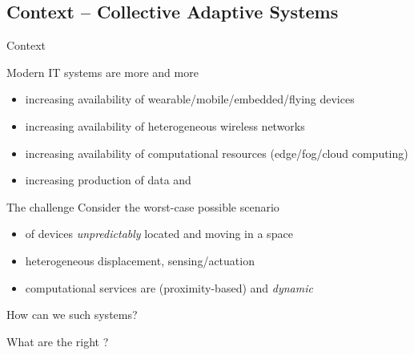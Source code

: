 \documentclass[presentation, 9pt]{beamer}\mode<presentation>{\usetheme{AMSBolognaFC}}
\begin{document}
\subsection{Context -- Collective Adaptive Systems}
\begin{frame}{Context}\label{context:start}
\begin{exampleblock}{Modern IT systems are more and more }
	\begin{itemize}
		\item increasing availability of wearable/mobile/embedded/flying devices
		\item increasing availability of heterogeneous wireless networks
		\item increasing availability of computational resources (edge/fog/cloud computing)
		\item increasing production of data  and 
	\end{itemize}
\end{exampleblock}
\begin{alertblock}{The challenge}
	Consider the worst-case possible scenario
	\begin{itemize}
		\item {} of devices \emph{unpredictably} located and moving in a space
		\item heterogeneous displacement,  sensing/actuation
		\item computational services are  (proximity-based) and \emph{dynamic} 
	\end{itemize}
\end{alertblock}
\begin{center}
\Large{How can we  such systems?}
\end{center}
\begin{center}
	\Large{What are the right ?}
	\end{center}
\end{frame}
\end{document}
